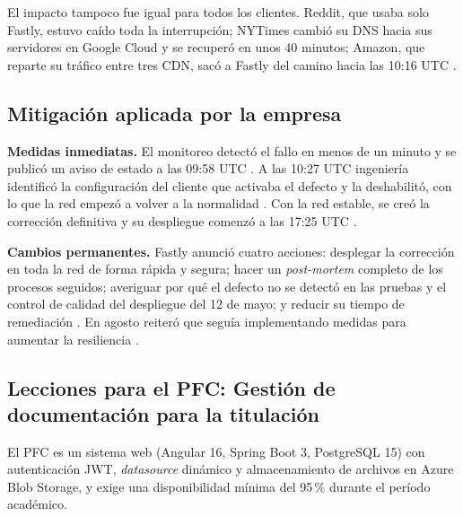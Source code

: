 El impacto tampoco fue igual para todos los clientes. Reddit, que usaba solo
Fastly, estuvo caído toda la interrupción; NYTimes cambió su DNS hacia sus
servidores en Google Cloud y se recuperó en unos 40 minutos; Amazon, que reparte
su tráfico entre tres CDN, sacó a Fastly del camino hacia las 10:16 UTC
\cite{medina2021thousandeyes}.

\subsection*{Mitigación aplicada por la empresa}

\textbf{Medidas inmediatas.} El monitoreo detectó el fallo en menos de un minuto
y se publicó un aviso de estado a las 09:58 UTC \cite{fastly2021summary,fastly2021q2}.
A las 10:27 UTC ingeniería identificó la configuración del cliente que activaba el
defecto \cite{fastly2021summary} y la deshabilitó, con lo que la red empezó a volver
a la normalidad \cite{fastly2021tweet}. Con la red estable, se creó la corrección
definitiva y su despliegue comenzó a las 17:25 UTC \cite{fastly2021summary}.

\textbf{Cambios permanentes.} Fastly anunció cuatro acciones: desplegar la
corrección en toda la red de forma rápida y segura; hacer un \textit{post-mortem}
completo de los procesos seguidos; averiguar por qué el defecto no se detectó en
las pruebas y el control de calidad del despliegue del 12 de mayo; y reducir su
tiempo de remediación \cite{fastly2021summary}. En agosto reiteró que seguía
implementando medidas para aumentar la resiliencia \cite{fastly2021q2}.

\subsection*{Lecciones para el PFC: Gestión de documentación para la titulación}

El PFC es un sistema web (Angular 16, Spring Boot 3, PostgreSQL 15) con autenticación
JWT, \textit{datasource} dinámico y almacenamiento de archivos en Azure Blob Storage,
y exige una disponibilidad mínima del 95\,\% durante el período académico.

